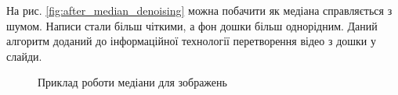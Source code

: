 На рис. \ref{fig:after_median_denoising} можна побачити як медіана справляється з шумом. Написи стали більш чіткими,
а фон дошки більш однорідним. Даний алгоритм доданий до інформаційної технології перетворення відео
з дошки у слайди.

\begin{figure}[H]
    \centering
    \caption{Приклад роботи медіани для зображень \cite{yakovlev_discrete_math_video}
    }
\end{figure}